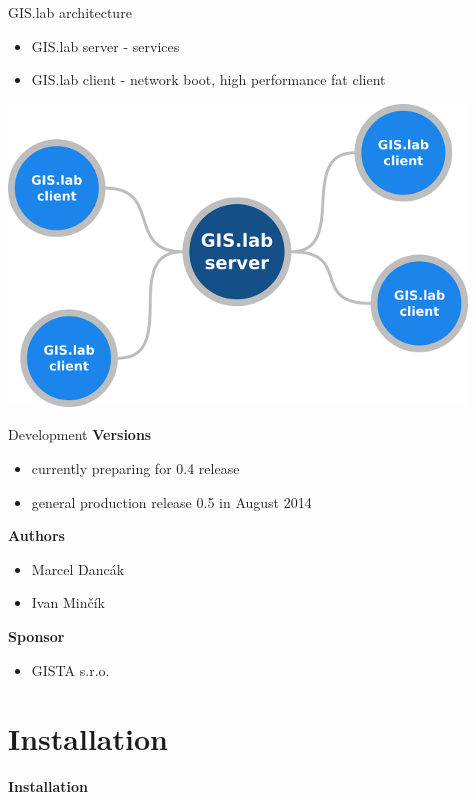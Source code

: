 \documentclass[12pt]{beamer}
\begin{document}
\begin{frame}{GIS.lab architecture}
	\begin{itemize}
		\item GIS.lab server - services
		\item GIS.lab client - network boot, high performance fat client
	\end{itemize}
	\begin{center}
		\includegraphics[keepaspectratio=true,height=0.6\textheight]{images/gislab-architecture.png}
	\end{center}
\end{frame}


\begin{frame}{Development}
	\textbf{Versions}
	\begin{itemize}
		\item currently preparing for 0.4 release
		\item general production release 0.5 in August 2014
	\end{itemize}

	\textbf{Authors}
	\begin{itemize}
		\item Marcel Dancák
		\item Ivan Minčík
	\end{itemize}

	\textbf{Sponsor}
	\begin{itemize}
		\item GISTA s.r.o.
	\end{itemize}
\end{frame}


\section{Installation}
\begin{frame}
	\begin{center}
		\LARGE\textbf{Installation}	
	\end{center}
\end{frame}
\end{document}
